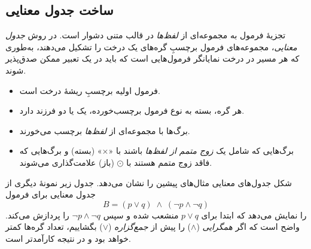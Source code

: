 \subsection*{ ساخت جدول معنایی }
  
  تجزیهٔ فرمول به مجموعه‌ای از \emph{لفظ‌ها} در قالب متنی دشوار است. در روش \emph{جدول معنایی}، مجموعه‌های فرمول برچسبِ گره‌های یک درخت را تشکیل می‌دهند، به‌طوری که هر مسیر در درخت نمایانگر فرمول‌هایی است که باید در یک تعبیر ممکن صدق‌پذیر شوند.
  
  \begin{itemize}
    \item فرمول اولیه برچسبِ ریشهٔ درخت است.
    \item هر گره، بسته به نوع فرمول برچسب‌خورده، یک یا دو فرزند دارد.
    \item برگ‌ها با مجموعه‌ای از \emph{لفظ‌ها} برچسب می‌خورند.
    \item برگ‌هایی که شامل یک \emph{زوج متمم از لفظ‌ها} باشند با «$\times$» (بسته) و برگ‌هایی که فاقد زوج متمم هستند با $\odot$ (باز) علامت‌گذاری می‌شوند.
  \end{itemize}
  
  شکل  جدول‌های معنایی مثال‌های پیشین را نشان می‌دهد. جدول زیر نمونهٔ دیگری از جدول معنایی برای فرمول
  \[
  B = (p \lor q)\;\land\;(\neg p \land \neg q)
  \]
  را نمایش می‌دهد که ابتدا برای $p \lor q$ منشعب شده و سپس $\neg p \land \neg q$ را پردازش می‌کند. واضح است که اگر \emph{همگرایی} ($\land$) را پیش از \emph{جمع‌گزاره} ($\lor$) بگشاییم، تعداد گره‌ها کمتر خواهد بود و در نتیجه کارآمدتر است.
  
  \begin{figure}[ht]
    \centering
    \begin{latin}
    \end{latin}
  \end{figure}
  

